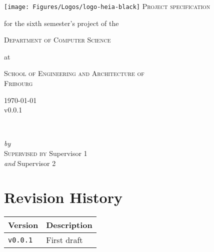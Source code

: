 \begin{titlepage}
	\begin{center}
	    \texttt{[image: Figures/Logos/logo-heia-black]}
	    \vskip 2cm
		\textsc{\huge Project specification}
        \vskip 1cm
        \begin{large}
          for the sixth semester's project of the\\[0.50cm]
          \begin{Large}
            \textsc{Department of Computer Science}\\[0.50cm]
          \end{Large}
          at\\[0.50cm]
          \begin{Large}
            \textsc{School of Engineering and Architecture of\\Fribourg}\par
          \end{Large}
        \end{large}
		\vfill
        \today \\
        v0.0.1
	\end{center}
\end{titlepage}


\begin{titlepage}
  \vspace*{5cm}
  \makeatletter
  \begin{center}
    \begin{Huge}
      \@title
    \end{Huge}\\[0.1cm]
    \begin{Large}
      \@subtitle
    \end{Large}
    \vskip 0.25cm
    \emph{by}
    \vskip 0.25cm
    \@author \\
    \vfill
    \textsc{Supervised by}
    \vskip 0.25cm
    Supervisor 1\\
    \vskip 0.1cm
    \emph{and}
    \vskip 0.1cm
    Supervisor 2\\
  \end{center}
  
  \makeatother
\end{titlepage}

\cleardoublepage


\chapter*{Revision History}
\begin{table}[h]
  \centering
  \begin{tabularx}{\textwidth}{ll}
    \toprule
    \textbf{Version}           & \textbf{Description}\\
    \midrule
      \texttt{v0.0.1}          & First draft\\
    \bottomrule
  \end{tabularx}
\end{table}


\thispagestyle{empty}
\cleardoublepage
